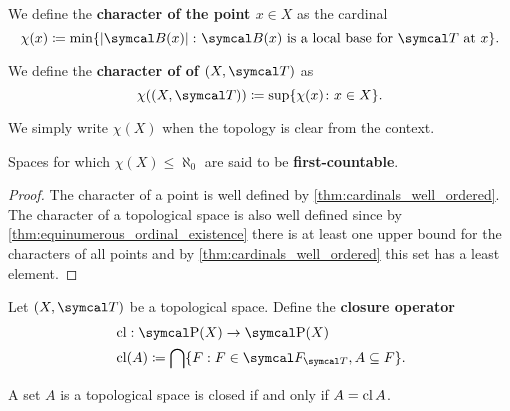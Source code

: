\begin{definition}\label{def:topological_space_character}
  We define the \textbf{character of the point \( x \in X \)} as the cardinal
  \begin{equation*}
    \chi(x) \coloneqq \min \{ \Abs{\Cal{B(x)}} \colon \Cal{B(x)} \text{ is a local base for } \Cal{T} \text{ at } x \}.
  \end{equation*}

  We define the \textbf{character of of \( (X, \Cal{T}) \)} as
  \begin{equation*}
    \chi((X, \Cal{T})) \coloneqq \sup \{ \chi(x) \colon x \in X \}.
  \end{equation*}

  We simply write \( \chi(X) \) when the topology is clear from the context.

  Spaces for which \( \chi(X) \leq \aleph_0 \) are said to be \textbf{first-countable}.
\end{definition}
\begin{proof}
  The character of a point is well defined by \cref{thm:cardinals_well_ordered}. The character of a topological space is also well defined since by \cref{thm:equinumerous_ordinal_existence} there is at least one upper bound for the characters of all points and by \cref{thm:cardinals_well_ordered} this set has a least element.
\end{proof}

\begin{definition}\label{def:closure_operator}\cite[33]{Engelking1989}
  Let \( (X, \Cal{T}) \) be a topological space. Define the \textbf{closure operator}
  \begin{align*}
    &\Cl: \Power(X) \to \Power(X) \\
    &\Cl(A) \coloneqq \bigcap \{ F : F \in \Cal{F}_{\Cal{T}}, A \subseteq F \}.
  \end{align*}
\end{definition}

\begin{proposition}\label{thm:set_closed_iff_matches_closure}
  A set \( A \) is a topological space is closed if and only if \( A = \operatorname{cl} A \).
\end{proposition}

